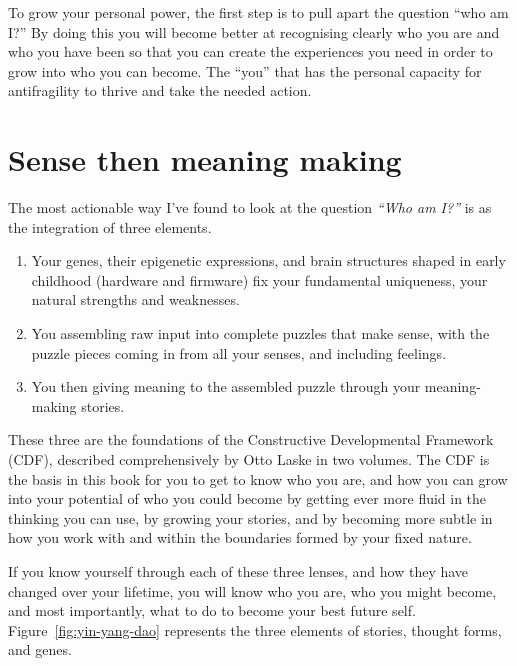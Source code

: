To grow your personal power, the first step is to pull apart the question “who am I?” By doing this you will become better at recognising clearly who you are and who you have been so that you can create the experiences you need in order to grow into who you can become. The “you” that has the personal capacity for antifragility  to thrive and take the needed action.






\section{Sense then meaning making}
\label{section:yin-yang-dao}


The most actionable way I've found to look at the question \emph{“Who am I?”} is as the integration of three elements.


\begin{enumerate}
\item Your genes, their epigenetic expressions, and brain structures shaped in early childhood (hardware and firmware) fix your fundamental uniqueness, your natural strengths and weaknesses. 
\item You assembling raw input into complete puzzles that make sense, with the puzzle pieces coming in from all your senses, and including feelings.
\item You then giving meaning to the assembled puzzle through your meaning\hyp{}making stories.  
\end{enumerate}


These three are the foundations of the Constructive Developmental Framework  (CDF), described comprehensively by Otto Laske  in two volumes\cite{laske-vol1,laske-vol2}. The CDF is the basis in this book for you to get to know who you are, and how you can grow into your potential of who you could become by getting ever more fluid in the thinking you can use, by growing your stories, and by becoming more subtle in how you work with and within the boundaries formed by your fixed nature.


If you know yourself through each of these three lenses, and how they have changed over your lifetime, you will know who you are, who you might become, and most importantly, what to do to become your best future self. Figure~\ref{fig:yin-yang-dao} represents the three elements of stories, thought forms, and genes. 


